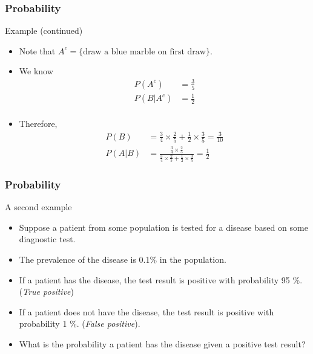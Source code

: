 \documentclass[handout]{beamer}
\begin{document}

   \begin{frame} \frametitle{Probability}

   \begin{block}
   {Example (continued)}

   \begin{itemize}
   \item Note that $A^c=\{\text{draw a blue marble on first draw}\}$.
   \item We know
   $$
   \begin{aligned}
   P(A^c) &= \frac{3}{5} \\
   P(B|A^c) &= \frac{1}{2} \\
   \end{aligned}
   $$
   \item Therefore,
   $$
   \begin{aligned}
   P(B) &= \frac{3}{4} \times \frac{2}{5}  + \frac{1}{2} \times \frac{3}{5} = \frac{3}{10}     \\
   P(A|B) &= \frac{ \frac{3}{4} \times \frac{2}{5}}{\frac{3}{4} \times \frac{2}{5}  + \frac{1}{2} \times \frac{3}{5}} = \frac{1}{2}
   \end{aligned}
   $$
   \end{itemize}
   \end{block}
   \end{frame}


   \begin{frame} \frametitle{Probability}

   \begin{block}
   {A second example}

   \begin{itemize}
   \item Suppose a patient from some population is tested for a disease based on   some diagnostic test.
   \item The prevalence of the disease is 0.1\% in the population.
   \item If a patient has the disease, the test result is positive
   with probability 95 \%. ({\em True positive})
   \item If a patient does not have the disease, the test result is positive
   with probability 1 \%. ({\em False positive}).
   \item What is the probability a patient has the disease
   given a positive test result?
   \end{itemize}
   \end{block}
   \end{frame}
\end{document}
